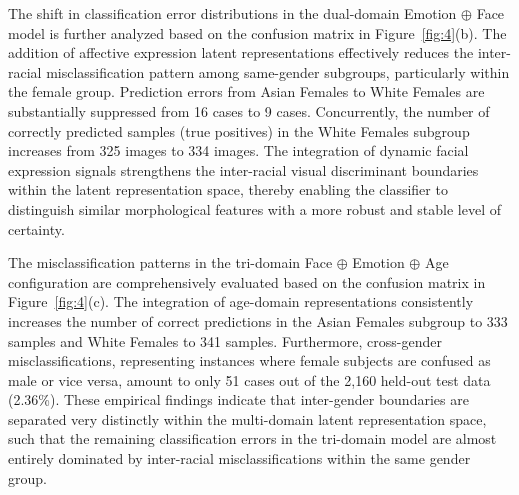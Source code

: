 The shift in classification error distributions in the dual-domain Emotion $\oplus$ Face model is further analyzed based on the confusion matrix in Figure~\ref{fig:4}(b). The addition of affective expression latent representations effectively reduces the inter-racial misclassification pattern among same-gender subgroups, particularly within the female group. Prediction errors from Asian Females to White Females are substantially suppressed from 16 cases to 9 cases. Concurrently, the number of correctly predicted samples (true positives) in the White Females subgroup increases from 325 images to 334 images. The integration of dynamic facial expression signals strengthens the inter-racial visual discriminant boundaries within the latent representation space, thereby enabling the classifier to distinguish similar morphological features with a more robust and stable level of certainty.

The misclassification patterns in the tri-domain Face $\oplus$ Emotion $\oplus$ Age configuration are comprehensively evaluated based on the confusion matrix in Figure~\ref{fig:4}(c). The integration of age-domain representations consistently increases the number of correct predictions in the Asian Females subgroup to 333 samples and White Females to 341 samples. Furthermore, cross-gender misclassifications, representing instances where female subjects are confused as male or vice versa, amount to only 51 cases out of the 2,160 held-out test data (2.36\%). These empirical findings indicate that inter-gender boundaries are separated very distinctly within the multi-domain latent representation space, such that the remaining classification errors in the tri-domain model are almost entirely dominated by inter-racial misclassifications within the same gender group.
